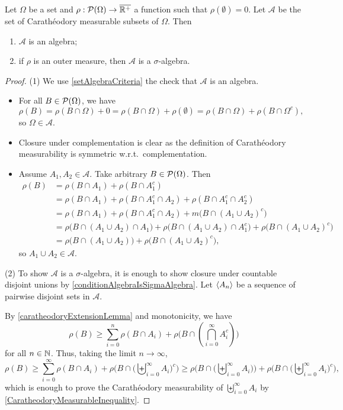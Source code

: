 \begin{proposition} \label{caratheodoryMeasurableAlgebra}
Let $\Omega$ be a set and $\rho: \operatorname{\mathcal{P}}(\Omega) \to \overline{\mathbb{R}^+}$ a function such that $\rho(\emptyset) = 0$. Let $\mathcal{A}$ be the set of Carathéodory measurable subsets of $\Omega$. Then
\begin{enumerate}
\item $\mathcal{A}$ is an algebra;
\item if $\rho$ is an outer measure, then $\mathcal{A}$ is a $\sigma$-algebra.
\end{enumerate}
\end{proposition}
\begin{proof}
(1) We use \ref{setAlgebraCriteria} the check that $\mathcal{A}$ is an algebra.
\begin{itemize}
\item For all $B\in \operatorname{\mathcal{P}}(\Omega)$, we have
\[ \rho(B) = \rho(B\cap \Omega) + 0 = \rho(B\cap \Omega) + \rho(\emptyset) = \rho(B\cap \Omega) + \rho(B\cap \Omega^c), \]
so $\Omega\in \mathcal{A}$.
\item Closure under complementation is clear as the definition of Carathéodory measurability is symmetric w.r.t.\ complementation.
\item Assume $A_1,A_2 \in \mathcal{A}$. Take arbitrary $B\in\operatorname{\mathcal{P}}(\Omega)$. Then
\begin{align*}
\rho(B) &= \rho(B\cap A_1) + \rho(B\cap A_1^c) \\
&= \rho(B\cap A_1) + \rho(B\cap A_1^c\cap A_2) + \rho(B\cap A_1^c\cap A_2^c) \\
&= \rho(B\cap A_1) + \rho(B\cap A_1^c\cap A_2) + m\big(B\cap (A_1\cup A_2)^c\big) \\
&= \rho\big(B\cap (A_1\cup A_2)\cap A_1\big) + \rho\big(B\cap (A_1\cup A_2)\cap A_1^c\big) + \rho\big(B\cap (A_1\cup A_2)^c\big) \\
&= \rho\big(B\cap (A_1\cup A_2)\big) + \rho\big(B\cap (A_1\cup A_2)^c\big),
\end{align*}
so $A_1\cup A_2\in \mathcal{A}$.
\end{itemize}

(2) To show $\mathcal{A}$ is a $\sigma$-algebra, it is enough to show closure under countable disjoint unions by \ref{conditionAlgebraIsSigmaAlgebra}. Let $\left\langle A_n \right\rangle$ be a sequence of pairwise disjoint sets in $\mathcal{A}$. 

By \ref{caratheodoryExtensionLemma} and monotonicity, we have
\[ \rho(B) \geq \sum_{i=0}^n \rho(B\cap A_i) + \rho\big(B\cap (\bigcap_{i=0}^\infty A_i^c)\big) \]
for all $n\in \mathbb{N}$. Thus, taking the limit $n\to\infty$,
\[ \rho(B) \geq \sum_{i=0}^\infty \rho(B\cap A_i) + \rho\Big(B\cap \big(\biguplus_{i=0}^\infty A_i\big)^c\Big) \geq \rho\Big(B\cap \big(\biguplus_{i=0}^\infty A_i\big)\Big) + \rho\Big(B\cap \big(\biguplus_{i=0}^\infty A_i\big)^c\Big), \]
which is enough to prove the  Carathéodory measurability of $\biguplus_{i=0}^\infty A_i$ by \ref{CaratheodoryMeasurableInequality}.
\end{proof}


